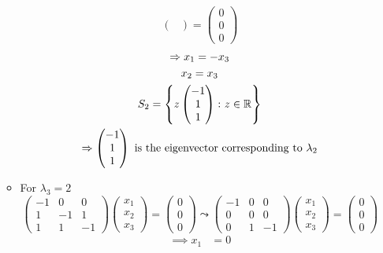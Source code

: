 \begin{enumerate}
\begin{itemize}
\begin{equation}
\begin{pmatrix}
\end{pmatrix}
=
\begin{pmatrix}
0\\0\\0
\end{pmatrix}
\end{equation}
\begin{gather}
\implies x_1 =- x_3\\
x_2 = x_3\\
S_2 = \left\{ z\begin{pmatrix}-1\\1\\1\end{pmatrix} \colon z \in
  \mathbb{R}\right\}\\
\notag \implies \begin{pmatrix}-1\\1\\1\end{pmatrix} \text{ is the
  eigenvector corresponding to } \lambda_2
\end{gather}
\item For $\lambda_3 = 2$
\begin{equation}
\begin{pmatrix}
-1 & 0 & 0\\
1 & -1 & 1\\
1 & 1 & -1
\end{pmatrix}
\begin{pmatrix}
x_1\\x_2\\x_3
\end{pmatrix}
=
\begin{pmatrix}
0\\0\\0
\end{pmatrix}
\leadsto
\begin{pmatrix}
-1 & 0 & 0\\
0 & 0 & 0\\
0 & 1 & -1
\end{pmatrix}
\begin{pmatrix}
x_1\\x_2\\x_3
\end{pmatrix}
=
\begin{pmatrix}
0\\0\\0
\end{pmatrix}
\end{equation}
\begin{align}
\implies x_1 &= 0\\

\end{align}
\end{itemize}
\end{enumerate}
